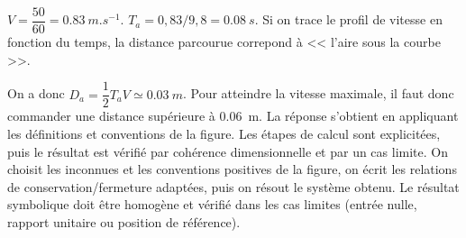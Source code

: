 \begin{corrigebox}
$V = \dfrac{50}{60} = \SI{0,83}{m.s^{-1}}$.
$T_a =0,83/9,8 = \SI{0,08}{s}$.
Si on trace le profil de vitesse en fonction du temps, la distance parcourue correpond à << l'aire sous la courbe >>. 

On a donc $D_a = \dfrac{1}{2}T_a V  \simeq \SI{0,03}{m}$.
Pour atteindre la vitesse maximale, il faut donc commander une distance supérieure à \SI{0,06}{m}.
La réponse s'obtient en appliquant les définitions et conventions de la
    figure. Les étapes de calcul sont explicitées, puis le résultat est vérifié par
    cohérence dimensionnelle et par un cas limite.
On choisit les inconnues et les conventions positives de la figure,
        on écrit les relations de conservation/fermeture adaptées, puis on résout le
        système obtenu. Le résultat symbolique doit être homogène et vérifié dans les cas
        limites (entrée nulle, rapport unitaire ou position de référence).
\end{corrigebox}
